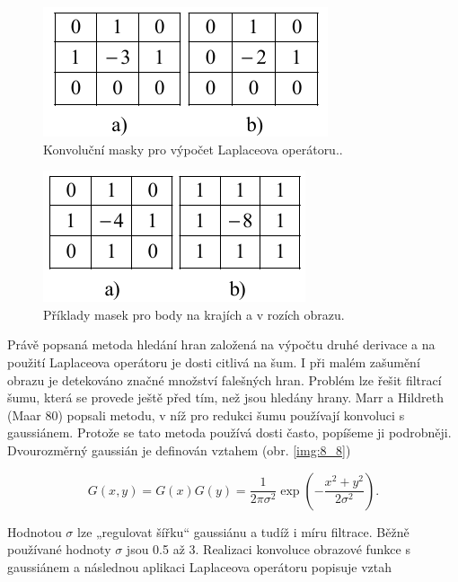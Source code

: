 \begin{figure}[th]
    \begin{center}
        \includegraphics[scale=0.9]{08_segmentace/images/img_8_6.pdf}
    \end{center}
    \caption{Konvoluční masky pro výpočet Laplaceova operátoru..}
    \label{img:8_6}
\end{figure}

\begin{figure}[th]
    \begin{center}
        \includegraphics[scale=0.9]{08_segmentace/images/img_8_7.pdf}
    \end{center}
    \caption{Příklady masek pro body na krajích a v rozích obrazu.}
    \label{img:8_7}
\end{figure}

Právě popsaná metoda hledání hran založená na výpočtu druhé derivace a na použití Laplaceova operátoru je dosti citlivá na šum. I při malém zašumění obrazu je detekováno značné množství falešných hran. Problém lze řešit filtrací šumu, která se provede ještě před tím, než jsou hledány hrany. Marr a Hildreth (Maar 80) popsali metodu, v níž pro redukci šumu používají konvoluci s gaussiánem. Protože se tato metoda používá dosti často, popíšeme ji podrobněji. Dvourozměrný gaussián je definován vztahem (obr. \ref{img:8_8})


\begin{equation} \label{eq:8_18}
    G(x, y) = G(x)G(y) = \frac{1}{2\pi \sigma^2} \exp \left( - \frac{x^2 + y^2}{2\sigma^2} \right).
\end{equation}

Hodnotou $\sigma$ lze „regulovat šířku`` gaussiánu a tudíž i míru filtrace. Běžně používané hodnoty $\sigma$ jsou 0.5 až 3. Realizaci konvoluce obrazové funkce s gaussiánem a následnou aplikaci Laplaceova operátoru popisuje vztah

